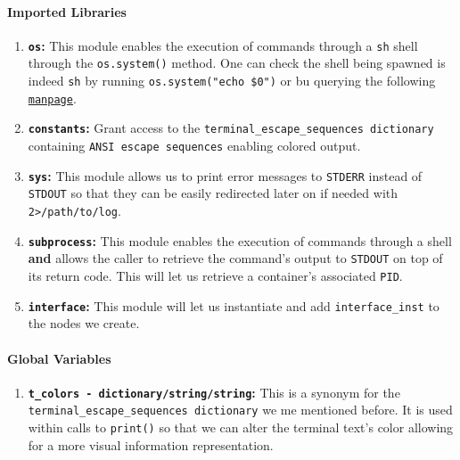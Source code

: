                 \paragraph{Imported Libraries}
                    \begin{enumerate}
                        \item \textbf{\texttt{os}:} This module enables the execution of commands through a \texttt{sh} shell through the \texttt{os.system()} method. One can check the shell being spawned is indeed \texttt{sh} by running \texttt{\allowbreak os.system("echo \$0")} or bu querying the following \href{https://linux.die.net/man/3/system}{\texttt{manpage}}.
                        \item \textbf{\texttt{constants}:} Grant access to the \texttt{\allowbreak terminal\_escape\_sequences dictionary} containing \texttt{ANSI escape sequences} enabling colored output.
                        \item \textbf{\texttt{sys}:} This module allows us to print error messages to \texttt{STDERR} instead of \texttt{STDOUT} so that they can be easily redirected later on if needed with \texttt{2>/path/to/log}.
                        \item \textbf{\texttt{subprocess}:} This module enables the execution of commands through a shell \textbf{and} allows the caller to retrieve the command's output to \texttt{STDOUT} on top of its return code. This will let us retrieve a container's associated \texttt{PID}.
                        \item \textbf{\texttt{interface}:} This module will let us instantiate and add \texttt{interface\_inst} to the nodes we create.
                    \end{enumerate}

                \paragraph{Global Variables}
                    \begin{enumerate}
                        \item \textbf{\texttt{\allowbreak t\_colors - dictionary/string/string}:} This is a synonym for the \texttt{\allowbreak terminal\_escape\_sequences dictionary} we me mentioned before. It is used within calls to \texttt{print()} so that we can alter the terminal text's color allowing for a more visual information representation.
                    \end{enumerate}


